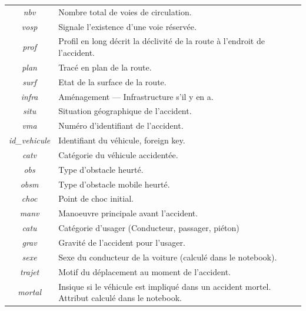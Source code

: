 \documentclass{article}
\begin{document}
\begin{center}
\begin{tabular}{ |c|p{9cm}| }
            \textit{nbv} & Nombre total de voies de circulation. \\  
            \textit{vosp} & Signale l'existence d'une voie réservée. \\  
            \textit{prof} & Profil en long décrit la déclivité de la route à l'endroit de l'accident. \\  
            \textit{plan} & Tracé en plan de la route. \\  
            \textit{surf} & Etat de la surface de la route. \\  
            \textit{infra} & Aménagement --- Infrastructure s'il y en a. \\  
            \textit{situ} & Situation géographique de l'accident. \\  
            \textit{vma} & Numéro d'identifiant de l'accident. \\
            \textit{id\_vehicule} & Identifiant du véhicule, foreign key. \\
            \textit{catv} & Catégorie du véhicule accidentée. \\  
            \textit{obs} & Type d'obstacle heurté. \\
            \textit{obsm} & Type d'obstacle mobile heurté. \\
            \textit{choc} & Point de choc initial. \\
            \textit{manv} & Manoeuvre principale avant l'accident. \\
            \textit{catu} & Catégorie d'usager (Conducteur, passager, piéton) \\
            \textit{grav} & Gravité de l'accident pour l'usager. \\
            \textit{sexe} & Sexe du conducteur de la voiture (calculé dans le notebook). \\
            \textit{trajet} & Motif du déplacement au moment de l'accident. \\
            \textit{mortal} & Insique si le véhicule est impliqué dans un accident mortel. Attribut calculé dans le notebook. \\
            \hline
        \end{tabular}
    \end{center}
\end{document}
